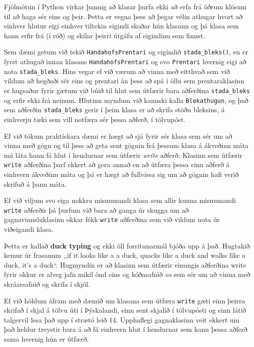 Fjölmótun í Python virkar þannig að klasar þurfa ekki að erfa frá öðrum klösum til að haga sér eins og þeir.
Þetta er vegna þess að þegar vélin athugar hvort að einhver hlutur eigi einhver tiltekin eigindi skoðar hún klasann og þá klasa sem hann erfir frá (í röð) og skilar þeirri útgáfu af eigindinu sem finnst.

Sem dæmi getum við tekið \texttt{HandahofsPrentari} og eigindið \texttt{stada\_bleks()}, en er fyrst athugað innan klasans \texttt{HandahofsPrentari} og svo \texttt{Prentari} hvernig eigi að nota \texttt{stada\_bleks}.
Hins vegar ef við værum að vinna með eitthvað sem við vildum að hegðaði sér eins og prentari án þess að spá í öllu sem prentaraklasinn er hugsaður fyrir gætum við búið til hlut sem útfærir bara aðferðina \texttt{stada\_bleks} og erfir ekki frá neinum.
Hlutinn myndum við kannski kalla \texttt{Blekathugun}, og það sem aðferðin \texttt{stada\_bleks} gerir í þeim klasa er að skrifa stöðu bleksins, á einhverju tæki sem vill notfæra sér þessa aðferð, í tölvupóst.

Ef við tökum praktískara dæmi er hægt að sjá fyrir sér klasa sem sér um að vinna með gögn og til þess að geta sent gögnin frá þessum klasa á ákveðinn máta má láta hann fá hlut í hendurnar sem útfærir \textit{write} aðferð.
Klasinn sem útfærir \texttt{write} aðferðina þarf ekkert að gera annað en að útfæra þessa einu aðferð á einhvern ákveðinn máta og þá er hægt að fullvissa sig um að gögnin hafi verið skrifuð á þann máta.

Ef við viljum svo eiga nokkra mismunandi klasa sem allir kunna mismunandi \texttt{write} aðferðir þá þurfum við bara að ganga úr skugga um að gagnavinnsluklasinn okkar fékk \texttt{write} aðferðina sem við vildum nota úr viðeigandi klasa.

Þetta er kallað \textbf{duck typing} og ekki öll forritunarmál bjóða upp á það.
Hugtakið kemur úr frasanum ,,if it looks like a a duck, quacks like a duck and walks like a duck, it's a duck“.
Hugmyndin er að klasinn sem útfærir einungis aðferðina write fyrir okkur er alveg jafn mikil önd eins og kóðasafnið \textit{os} sem sér um að vinna með skráarsafnið og skrifa í skjöl.

Ef við höldum áfram með dæmið um klasana sem útfæra \texttt{write} gæti einn þeirra skrifað í skjal á tölvu úti í Þýskalandi, einn sent skjalið í tölvupósti og einn látið talgervil lesa það upp í strætó leið 14.
Upphaflegi gagnaklasinn veit ekkert um það heldur treystir bara á að fá einhvern hlut í hendurnar sem kann þessa aðferð sama hvernig hún er útfærð.

